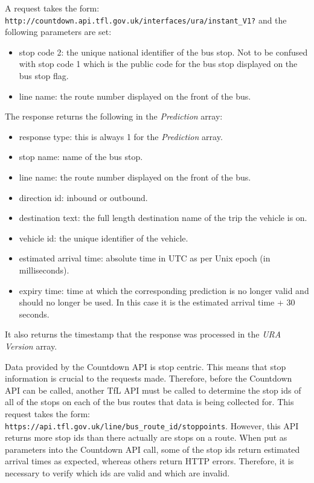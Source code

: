\documentclass[12pt, a4paper]{article}
\begin{document}
A request takes the form: \texttt{http://countdown.api.tfl.gov.uk/interfaces/ura/instant\_V1?} and the following parameters are set: 
\begin{itemize}
    \item stop code 2: the unique national identifier of the bus stop. Not to be confused with stop code 1 which is the public code for the bus stop displayed on the bus stop flag.
    \item line name: the route number displayed on the front of the bus.
\end{itemize}
The response returns the following in the \textit{Prediction} array: 
\begin{itemize}
    \item response type: this is always 1 for the \textit{Prediction} array.
    \item stop name: name of the bus stop.
    \item line name: the route number displayed on the front of the bus.
    \item direction id: inbound or outbound.
    \item destination text: the full length destination name of the trip the vehicle is on.
    \item vehicle id: the unique identifier of the vehicle.
    \item estimated arrival time: absolute time in UTC as per Unix epoch (in milliseconds).
    \item expiry time: time at which the corresponding prediction is no longer valid and should no longer be used. In this case it is the estimated arrival time + 30 seconds. 
\end{itemize}
It also returns the timestamp that the response was processed in the \textit{URA Version} array.

Data provided by the Countdown API is stop centric. This means that stop information is crucial to the requests made. Therefore, before the Countdown API can be called, another TfL API must be called to determine the stop ids of all of the stops on each of the bus routes that data is being collected for. This request takes the form: \texttt{https://api.tfl.gov.uk/line/bus\_route\_id/stoppoints}. However, this API returns more stop ids than there actually are stops on a route. When put as parameters into the Countdown API call, some of the stop ids return estimated arrival times as expected, whereas others return HTTP errors. Therefore, it is necessary to verify which ids are valid and which are invalid.

\clearpage
\end{document}
